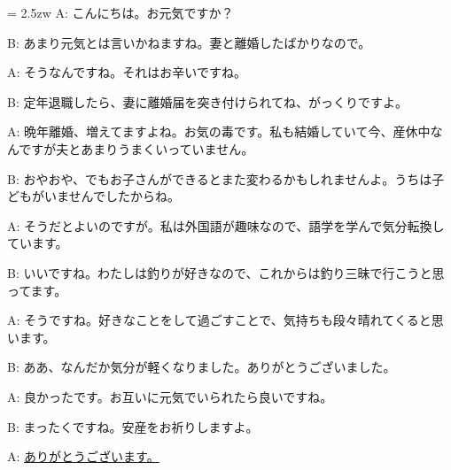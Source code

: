 \documentclass[11pt]{amsart}
\title{}
\author{}
\newenvironment{hangall}[1]{\hangindent = 2.5zw\everypar{\hangindent = 2.5zw}}{}
\begin{document}
\maketitle
\begin{hangall}{}%
A: こんにちは。お元気ですか？

B: あまり元気とは言いかねますね。妻と離婚したばかりなので。

A: そうなんですね。それはお辛いですね。

B: 定年退職したら、妻に離婚届を突き付けられてね、がっくりですよ。

A: 晩年離婚、増えてますよね。お気の毒です。私も結婚していて今、産休中なんですが夫とあまりうまくいっていません。

B: おやおや、でもお子さんができるとまた変わるかもしれませんよ。うちは子どもがいませんでしたからね。

A: そうだとよいのですが。私は外国語が趣味なので、語学を学んで気分転換しています。

B: いいですね。わたしは釣りが好きなので、これからは釣り三昧で行こうと思ってます。

A: そうですね。好きなことをして過ごすことで、気持ちも段々晴れてくると思います。

B: ああ、なんだか気分が軽くなりました。ありがとうございました。

A: 良かったです。お互いに元気でいられたら良いですね。

B: まったくですね。安産をお祈りしますよ。

A: \ul{ありがとうございます。}\end{hangall}
\end{document}
